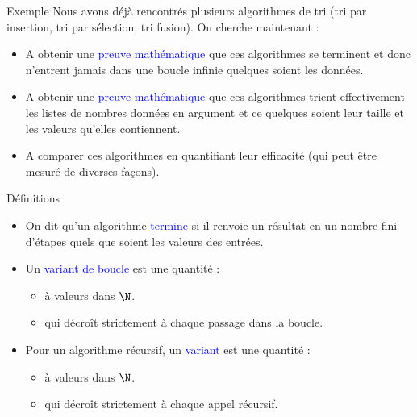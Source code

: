 \documentclass[10pt]{beamer}
\begin{document}
\begin{frame}[fragile]{\Ctitle}{\stitle}
	\begin{exampleblock}{Exemple}
		Nous avons déjà rencontrés plusieurs algorithmes de tri (tri par insertion, tri par sélection, tri fusion). On cherche maintenant :
		\begin{itemize}
			\item <2-> A obtenir une \textcolor{blue}{preuve mathématique} que ces algorithmes se terminent et donc n'entrent jamais dans une boucle infinie quelques soient les données.
			\item <3-> A obtenir une \textcolor{blue}{preuve mathématique} que ces algorithmes trient effectivement les listes de nombres données en argument et ce quelques soient leur taille et les valeurs qu'elles contiennent.
			\item <4-> A comparer ces algorithmes en quantifiant leur efficacité (qui peut être mesuré de diverses façons).
		\end{itemize}
	\end{exampleblock}
\end{frame}

\begin{frame}[fragile]{\Ctitle}{\stitle}
	\begin{block}{Définitions}
		\begin{itemize}
			\item On dit qu'un algorithme \textcolor{blue}{termine} si il renvoie un résultat en un nombre fini d'étapes quels que soient les valeurs des entrées.
			\item<2-> Un \textcolor{blue}{variant de boucle} est une quantité :
				\begin{itemize}
					\item<3-> à valeurs dans $\N$.
					\item<4-> qui décroît strictement à chaque passage dans la boucle.
				\end{itemize}
			\item<5-> Pour un algorithme récursif, un \textcolor{blue}{variant} est une quantité :
				\begin{itemize}
					\item<6-> à valeurs dans $\N$.
					\item<7-> qui décroît strictement à chaque appel récursif.
				\end{itemize}
		\end{itemize}
	\end{block}
\end{frame}
\end{document}
